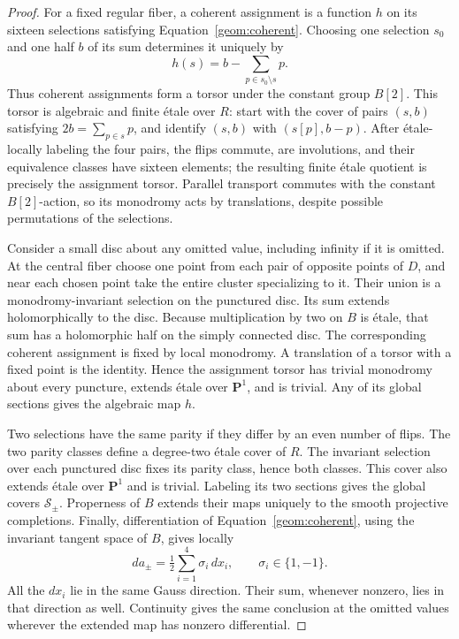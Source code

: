 \documentclass[11pt]{amsart}
\newcommand{\PP}{\mathbf P}
\theoremstyle{definition}
\theoremstyle{remark}
\numberwithin{equation}{section}
\begin{document}
\begin{proof}
For a fixed regular fiber, a coherent assignment is a function $h$ on
its sixteen selections satisfying Equation~\eqref{geom:coherent}.
Choosing one selection $s_0$ and one half $b$ of its sum determines
it uniquely by
\[
 h(s)=b-\sum_{p\in s_0\setminus s}p.
\]
Thus coherent assignments form a torsor under the constant group
$B[2]$.  This torsor is algebraic and finite étale over $R$: start
with the cover of pairs $(s,b)$ satisfying $2b=\sum_{p\in s}p$, and
identify $(s,b)$ with $(s[p],b-p)$.  After \'{e}tale-locally labeling
the four pairs, the flips commute, are involutions, and their
equivalence classes have sixteen elements;
the resulting finite étale quotient is precisely the assignment
torsor.  Parallel transport commutes with the constant $B[2]$-action,
so its monodromy acts by translations, despite possible permutations
of the selections.

Consider a small disc about any omitted value, including infinity
if it is omitted.
At the central fiber choose one point from each pair of opposite
points of $D$, and near each chosen point take the entire cluster
specializing to it.  Their union is a monodromy-invariant selection
on the punctured disc.  Its sum extends holomorphically to the disc.
Because multiplication by two on $B$ is étale, that sum has a
holomorphic half on the simply connected disc.  The corresponding
coherent assignment is fixed by local monodromy.  A translation of a
torsor with a fixed point is the identity.  Hence the assignment
torsor has trivial monodromy about every puncture, extends étale over
$\PP^1$, and is trivial.  Any of its global sections gives the
algebraic map $h$.

Two selections have the same parity if they differ by an even number
of flips.  The two parity classes define a degree-two \'{e}tale cover
of $R$.  The invariant selection over each punctured disc fixes its
parity class, hence both classes.  This cover also extends \'{e}tale
over $\PP^1$ and is trivial.  Labeling its two sections gives the
global covers $\mathcal S_\pm$.  Properness of $B$ extends their maps
uniquely to the smooth projective completions.  Finally,
differentiation of Equation~\eqref{geom:coherent}, using the invariant
tangent space of $B$, gives locally
\begin{equation}\label{geom:half-derivative}
 da_\pm=\tfrac12\sum_{i=1}^4\sigma_i\,dx_i,
 \qquad \sigma_i\in\{1,-1\}.
\end{equation}
All the $dx_i$ lie in the same Gauss direction.  Their sum, whenever
nonzero, lies in that direction as well.  Continuity gives the same
conclusion at the omitted values wherever the extended map has
nonzero differential.
\end{proof}
\end{document}
